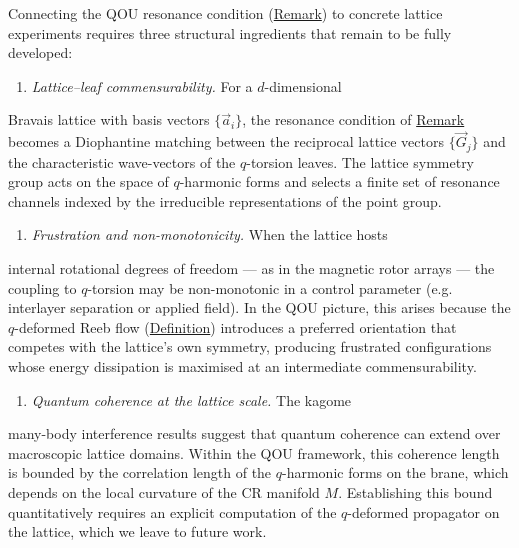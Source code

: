 \begin{remark}
  \label{rem:lattice-layout}
Connecting the QOU resonance condition (\hyperref[rem:crystal-probe-q]{Remark}) to
concrete lattice experiments requires three structural ingredients that remain
to be fully developed:

\begin{enumerate}
  \item \emph{Lattice--leaf commensurability.} For a $d$-dimensional
\end{enumerate}
   Bravais lattice with basis vectors $\{\vec{a}_i\}$, the resonance
   condition of \hyperref[rem:crystal-probe-q]{Remark} becomes a Diophantine
   matching between the reciprocal lattice vectors
   $\{\vec{G}_j\}$ and the characteristic wave-vectors of the
   $q$-torsion leaves. The lattice symmetry group acts on the space of
   $q$-harmonic forms and selects a finite set of resonance channels
   indexed by the irreducible representations of the point group.

\begin{enumerate}
  \item \emph{Frustration and non-monotonicity.} When the lattice hosts
\end{enumerate}
   internal rotational degrees of freedom --- as in the magnetic rotor
   arrays --- the coupling to $q$-torsion may be
   non-monotonic in a control parameter (e.g. interlayer separation or
   applied field). In the QOU picture, this arises because the
   $q$-deformed Reeb flow (\hyperref[def:q-reeb-flow]{Definition}) introduces
   a preferred orientation that competes with the lattice's own symmetry,
   producing frustrated configurations whose energy dissipation is
   maximised at an intermediate commensurability.

\begin{enumerate}
  \item \emph{Quantum coherence at the lattice scale.} The kagome
\end{enumerate}
   many-body interference results suggest that quantum
   coherence can extend over macroscopic lattice domains. Within the QOU
   framework, this coherence length is bounded by the correlation length
   of the $q$-harmonic forms on the brane, which depends on the local
   curvature of the CR manifold $M$. Establishing this bound
   quantitatively requires an explicit computation of the $q$-deformed
   propagator on the lattice, which we leave to future work.
\end{remark}

